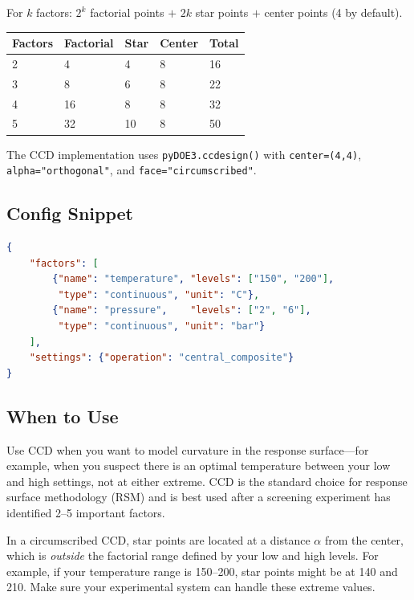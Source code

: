 \documentclass[11pt]{book}
\begin{document}
For $k$ factors: $2^k$ factorial points $+$ $2k$ star points $+$ center points (4 by default).

\begin{table}[H]
\centering
\begin{tabular}{@{}lllll@{}}
\toprule
\textbf{Factors} & \textbf{Factorial} & \textbf{Star} & \textbf{Center} & \textbf{Total} \\
\midrule
2 & 4 & 4 & 8 & 16 \\
3 & 8 & 6 & 8 & 22 \\
4 & 16 & 8 & 8 & 32 \\
5 & 32 & 10 & 8 & 50 \\
\bottomrule
\end{tabular}
\end{table}

The CCD implementation uses \texttt{pyDOE3.ccdesign()} with \texttt{center=(4,4)}, \texttt{alpha="orthogonal"}, and \texttt{face="circumscribed"}.

\subsection{Config Snippet}

\begin{lstlisting}[language=json]
{
    "factors": [
        {"name": "temperature", "levels": ["150", "200"],
         "type": "continuous", "unit": "C"},
        {"name": "pressure",    "levels": ["2", "6"],
         "type": "continuous", "unit": "bar"}
    ],
    "settings": {"operation": "central_composite"}
}
\end{lstlisting}

\subsection{When to Use}

Use CCD when you want to model curvature in the response surface---for example, when you suspect there is an optimal temperature between your low and high settings, not at either extreme. CCD is the standard choice for response surface methodology (RSM) and is best used after a screening experiment has identified 2--5 important factors.

\begin{keypoint}
In a circumscribed CCD, star points are located at a distance $\alpha$ from the center, which is \emph{outside} the factorial range defined by your low and high levels. For example, if your temperature range is 150--200, star points might be at 140 and 210. Make sure your experimental system can handle these extreme values.
\end{keypoint}
\end{document}
